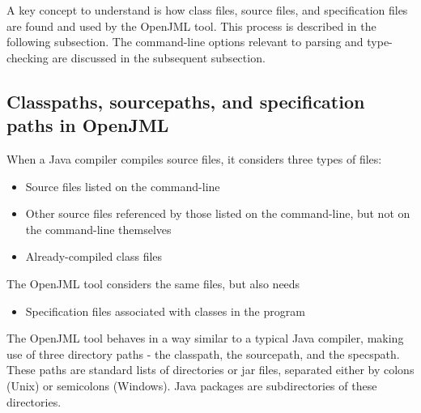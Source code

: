 A key concept to understand is how class files, source files, and specification files are found and used by the OpenJML tool. This
process is described in the following subsection. The command-line options relevant to parsing and type-checking are discussed in the subsequent subsection.

\subsection{Classpaths, sourcepaths, and specification paths in OpenJML}

When a Java compiler compiles source files, it considers three types of files:
\begin{itemize}[noitemsep,nolistsep]
\item Source files listed on the command-line
\item Other source files referenced by those listed on the command-line, but not on the command-line themselves
\item Already-compiled class files
\end{itemize}
The OpenJML tool considers the same files, but also needs
\begin{itemize}[noitemsep,nolistsep]
\item Specification files associated with classes in the program
\end{itemize}

The OpenJML tool behaves in a way similar to a typical Java compiler, 
making use of three directory paths - the classpath, the sourcepath, and the specspath.  
These paths are standard lists of directories or jar files, 
separated either by colons (Unix) or semicolons (Windows).  
Java packages are subdirectories of these directories.

